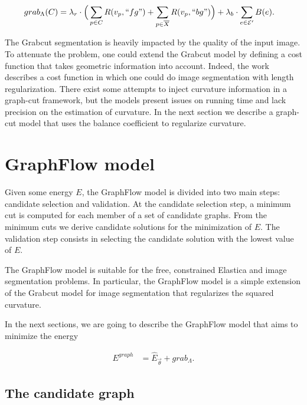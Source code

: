 \begin{align*}
	grab_{\Lambda}(C) &= \lambda_r \cdot \Big( \sum_{p \in C}{R(v_p,``fg")} + \sum_{p \in \overline{X}}{R(v_p,``bg")} \Big) + \lambda_b \cdot \sum_{e \in \mathcal{E}'}{B(e)}.
\end{align*}


The Grabcut segmentation is heavily impacted by the quality of the input image. To attenuate the problem, one could extend the Grabcut model by defining a cost function that takes geometric information into account. Indeed, the work \cite{boykov03geodesics} describes a cost function in which one could do image segmentation with length regularization. There exist some attempts \cite{nieuwenhuis14efficient,zehiry10fast} to inject curvature information in a graph-cut framework, but the models present issues on running time and lack precision on the estimation of curvature. In the next section we describe a graph-cut model that uses the balance coefficient to regularize curvature.


\section{GraphFlow model}
Given some energy $E$, the GraphFlow model is divided into two main steps: candidate selection and validation. At the candidate selection step, a minimum cut is computed for each member of a set of candidate graphs. From the minimum cuts we derive candidate solutions for the minimization of $E$. The validation step consists in selecting the candidate solution with the lowest value of $E$.

The GraphFlow model is suitable for the free, constrained Elastica and image segmentation problems. In particular, the GraphFlow model is a simple extension of the Grabcut model for image segmentation that regularizes the squared curvature.

In the next sections, we are going to describe the GraphFlow model that aims to minimize the energy

\begin{align}
E^{graph} &= \hat{E}_{\vec{\theta}} + grab_{\Lambda}.
\label{eq:graphflow-energy}
\end{align}


\subsection{The candidate graph}


